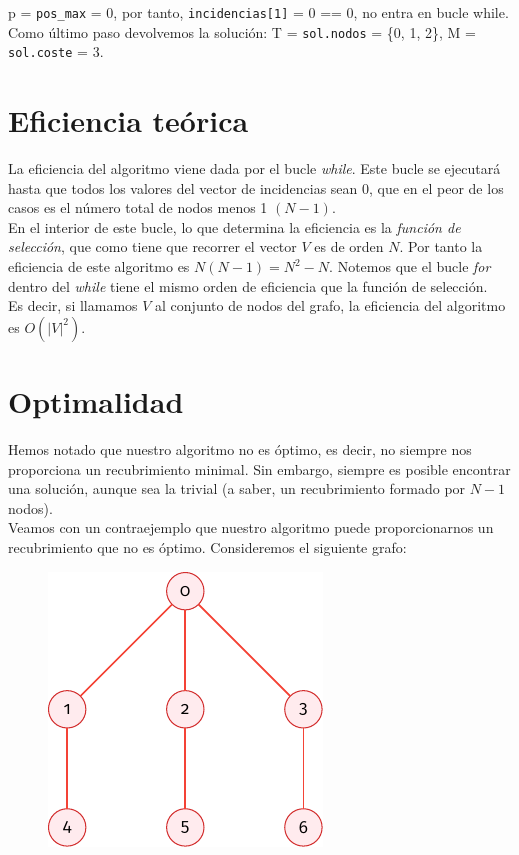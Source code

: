 \documentclass[11pt]{article}
\begin{document}
 p = \verb|pos_max| = 0, por tanto, \verb|incidencias[1]| = 0 == 0, no entra en bucle while. Como último paso devolvemos la solución:  T  = \verb|sol.nodos| = \{0, 1, 2\}, M = \verb|sol.coste| = 3.

\section*{Eficiencia teórica}
La eficiencia del algoritmo viene dada por el bucle \textit{while}. Este bucle se ejecutará hasta que todos los valores del vector de incidencias sean $0$, que en el peor de los casos es el número total de nodos menos 1 $(N - 1)$.\\

En el interior de este bucle, lo que determina la eficiencia es la \textit{función de selección}, que como tiene que recorrer el vector $V$ es de orden $N$. Por tanto la eficiencia de este algoritmo es $N(N-1) = N^2 - N$. Notemos que el bucle \textit{for} dentro del \textit{while} tiene el mismo orden de eficiencia que la función de selección.\\

Es decir, si llamamos $V$ al conjunto de nodos del grafo, la eficiencia del algoritmo es $O(|V|^2)$.

\section*{Optimalidad}

Hemos notado que nuestro algoritmo no es óptimo, es decir, no siempre nos proporciona un recubrimiento minimal. Sin embargo, siempre es posible encontrar una solución, aunque sea la trivial (a saber, un recubrimiento formado por $N-1$ nodos).\\

Veamos con un contraejemplo que nuestro algoritmo puede proporcionarnos un recubrimiento que no es óptimo. Consideremos el siguiente grafo:

\begin{figure}[H]
	\centering \includegraphics{./img/grafo2.pdf}
\end{figure}
\end{document}
